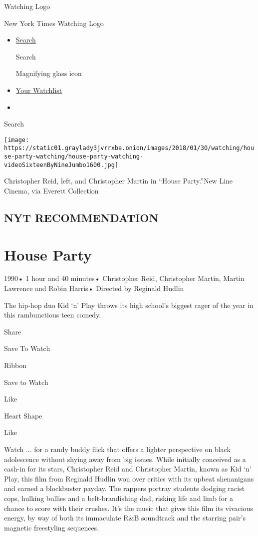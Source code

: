\href{/watching}{}

Watching Logo

New York Times Watching Logo

\begin{itemize}
\item
  \href{/watching/search}{Search}

  Search

  Magnifying glass icon
\item
  \href{/watching/watchlist}{Your Watchlist}
\item
\end{itemize}

Search

\texttt{[image: https://static01.graylady3jvrrxbe.onion/images/2018/01/30/watching/house-party-watching/house-party-watching-videoSixteenByNineJumbo1600.jpg]}

Christopher Reid, left, and Christopher Martin in ``House Party.''New
Line Cinema, via Everett Collection

\hypertarget{nyt-recommendation}{%
\subsection{NYT RECOMMENDATION}\label{nyt-recommendation}}

\hypertarget{house-party}{%
\section{House Party}\label{house-party}}

1990• 1 hour and 40 minutes• Christopher Reid, Christopher Martin,
Martin Lawrence and Robin Harris• Directed by Reginald Hudlin

The hip-hop duo Kid `n' Play throws its high school's biggest rager of
the year in this rambunctious teen comedy.

Share

Save To Watch

Ribbon

Save to Watch

Like

Heart Shape

Like

Watch ... for a randy buddy flick that offers a lighter perspective on
black adolescence without shying away from big issues. While initially
conceived as a cash-in for its stars, Christopher Reid and Christopher
Martin, known as Kid `n' Play, this film from Reginald Hudlin won over
critics with its upbeat shenanigans and earned a blockbuster payday. The
rappers portray students dodging racist cops, hulking bullies and a
belt-brandishing dad, risking life and limb for a chance to score with
their crushes. It's the music that gives this film its vivacious energy,
by way of both its immaculate R\&B soundtrack and the starring pair's
magnetic freestyling sequences.

